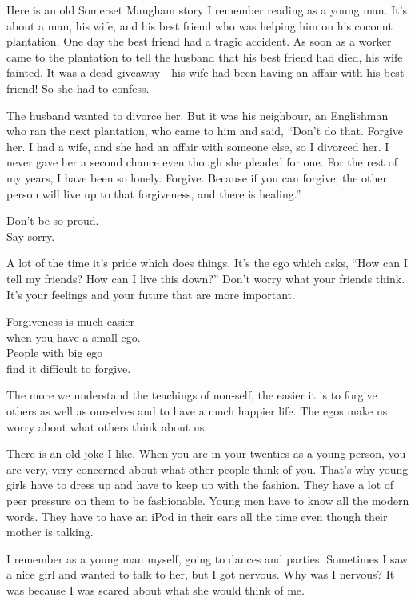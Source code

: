 \documentclass[12pt, openany]{book}
\newenvironment{aphorism}%
{%
\begin{center}\begin{itshape}
}%
{\end{itshape}\end{center}
}%
\begin{document}
Here is an old Somerset Maugham story I remember reading as a young man. It’s about a man, his wife, and his best friend who was helping him on his coconut plantation. One day the best friend had a tragic accident. As soon as a worker came to the plantation to tell the husband that his best friend had died, his wife fainted. It was a dead giveaway—his wife had been having an affair with his best friend! So she had to confess. 

The husband wanted to divorce her. But it was his neighbour, an Englishman who ran the next plantation, who came to him and said, “Don’t do that. Forgive her. I had a wife, and she had an affair with someone else, so I divorced her. I never gave her a second chance even though she pleaded for one. For the rest of my years, I have been so lonely. Forgive. Because if you can forgive, the other person will live up to that forgiveness, and there is healing.” 

\begin{aphorism}
Don’t be so proud.\\  
Say sorry.
\end{aphorism}

A lot of the time it’s pride which does things. It’s the ego which asks, “How can I tell my friends? How can I live this down?” Don’t worry what your friends think. It’s your feelings and your future that are more important. 

\begin{aphorism}
Forgiveness is much easier\\  
when you have a small ego.\\ 
People with big ego\\  
find it difficult to forgive.
\end{aphorism}

The more we understand the teachings of non-self, the easier it is to forgive others as well as ourselves and to have a much happier life. The egos make us worry about what others think about us. 

There is an old joke I like. When you are in your twenties as a young person, you are very, very concerned about what other people think of you. That’s why young girls have to dress up and have to keep up with the fashion. They have a lot of peer pressure on them to be fashionable. Young men have to know all the modern words. They have to have an iPod in their ears all the time even though their mother is talking. 

I remember as a young man myself, going to dances and parties. Sometimes I saw a nice girl and wanted to talk to her, but I got nervous. Why was I nervous? It was because I was scared about what she would think of me. 
\end{document}
